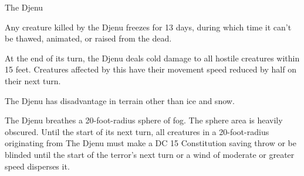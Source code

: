 \documentclass[letterpaper,openany,oneside,twocolumn]{book}
\begin{document}
\begin{DndMonster}[width=0.5\textwidth]{The Djenu}

    \DndMonsterBasics[
        armor-class = {16},
        hit-points  = {\DndDice{12d8 + 50}},
        speed       = {20 ft.},
      ]

    \DndMonsterAbilityScores[
        str = 16,
        dex = 10,
        con = 21,
        int = 4,
        wis = 13,
        cha = 7,
      ]

    \DndMonsterDetails[
        damage-immunities = {cold},
        senses = {passive Perception 11},
        condition-immunities = {exhaustion, frightened, paralyzed, petrified},
        challenge = 8,
      ]
      
      Any creature killed by the Djenu freezes for 13 days, during which time it can't be thawed, animated, or raised from the dead.
      
      At the end of its turn, the Djenu deals  cold damage to all hostile creatures within 15 feet. Creatures affected by this have their movement speed reduced by half on their next turn.
      
      The Djenu has disadvantage in terrain other than ice and snow.
      
      The Djenu breathes a 20-foot-radius sphere of fog. The sphere area is heavily obscured. Until the start of its next turn, all creatures in a 20-foot-radius originating from The Djenu must make a DC 15 Constitution saving throw or be blinded until the start of the terror's next turn or a wind of moderate or greater speed disperses it.
      
      \DndMonsterAttack[
      name=Shattering Claws,
      distance=melee, %
      mod=+3,
      reach=10,
      targets=one target,
      dmg=18,
      dmg-type=slashing,
    ]
      
\end{DndMonster}
\end{document}
